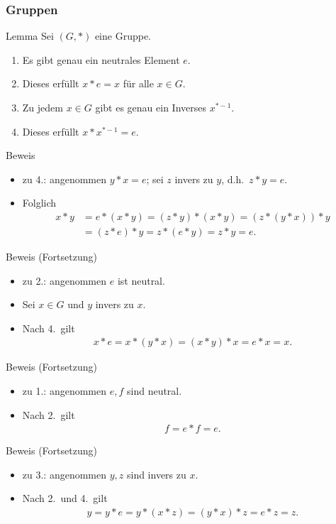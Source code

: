 \documentclass{beamer}
\newcommand{\ue}{\"u}
\begin{document}
\begin{frame}\frametitle{Gruppen}
	\begin{block}{Lemma}
		Sei $(G,*)$ eine Gruppe.
		\begin{enumerate}
			\item Es gibt genau ein neutrales Element $e$.
			\item Dieses erf\ue llt $x*e=x$ f\ue r alle $x\in G$.
			\item Zu jedem $x\in G$ gibt es genau ein Inverses $x^{*-1}$.
			\item Dieses erf\ue llt $x*x^{*-1}=e$.
		\end{enumerate}
	\end{block}
	\begin{overprint}
		\begin{block}{Beweis}
			\begin{itemize}
				\item \alert{zu 4.:} angenommen $y*x=e$; sei $z$ invers zu $y$, d.h.\ $z*y=e$. \item Folglich
					\begin{align*}
						x*y&=e*(x*y)=(z*y)*(x*y)=(z*(y*x))*y\\&=(z*e)*y=z*(e*y)=z*y=e.
					\end{align*}
			\end{itemize}
		\end{block}	
		\begin{block}{Beweis (Fortsetzung)}
			\begin{itemize}
				\item \alert{zu 2.:} angenommen $e$ ist neutral.
				\item  Sei $x\in G$ und $y$ invers zu $x$.
				\item Nach 4.\ gilt
					\begin{align*}
						x*e=x*(y*x)=(x*y)*x=e*x=x.
					\end{align*}
			\end{itemize}	
		\end{block}
		\begin{block}{Beweis (Fortsetzung)}
			\begin{itemize}
				\item \alert{zu 1.:} angenommen $e,f$ sind neutral.
				\item Nach 2.\ gilt
					\begin{align*}
						f=e*f=e.
					\end{align*}
			\end{itemize}	
		\end{block}
		\begin{block}{Beweis (Fortsetzung)}
			\begin{itemize}
				\item \alert{zu 3.:} angenommen $y,z$ sind invers zu $x$.
				\item Nach 2.\ und 4.\ gilt
					\begin{align*}
						y=y*e=y*(x*z)=(y*x)*z=e*z=z.
					\end{align*}
			\end{itemize}	
		\end{block}
	\end{overprint}
\end{frame}
\end{document}

